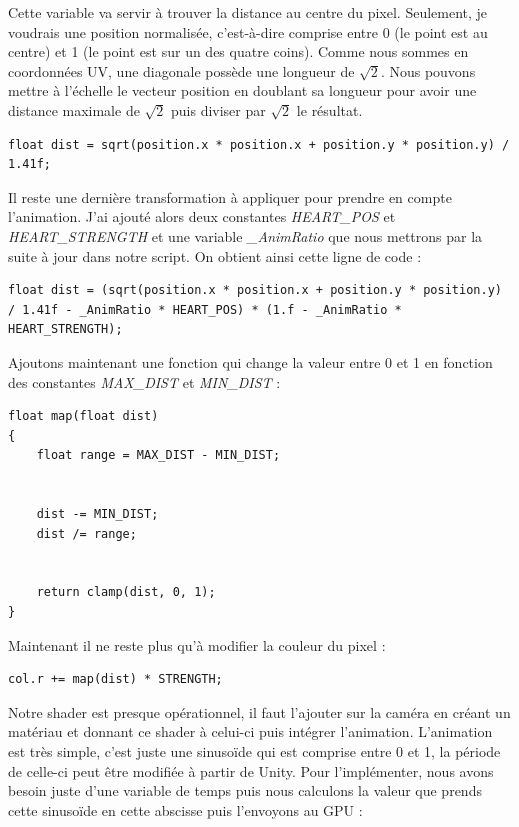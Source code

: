 \documentclass{article}
\begin{document}
Cette variable va servir à trouver la distance au centre du pixel. Seulement, je voudrais une position normalisée, c'est-à-dire comprise entre 0 (le point est au centre) et 1 (le point est sur un des quatre coins). Comme nous sommes en coordonnées UV, une diagonale possède une longueur de $\sqrt{2}$.
Nous pouvons mettre à l'échelle le vecteur position en doublant sa longueur pour avoir une distance maximale de $\sqrt{2}$ puis diviser par $\sqrt{2}$ le résultat.


\begin{lstlisting}
float dist = sqrt(position.x * position.x + position.y * position.y) / 1.41f;
\end{lstlisting}


Il reste une dernière transformation à appliquer pour prendre en compte l'animation.
J'ai ajouté alors deux constantes \emph{HEART\_POS} et \emph{HEART\_STRENGTH} et une variable \emph{\_AnimRatio} que nous mettrons par la suite à jour dans notre script.
On obtient ainsi cette ligne de code :


\begin{lstlisting}
float dist = (sqrt(position.x * position.x + position.y * position.y) / 1.41f - _AnimRatio * HEART_POS) * (1.f - _AnimRatio * HEART_STRENGTH);
\end{lstlisting}


Ajoutons maintenant une fonction qui change la valeur entre 0 et 1 en fonction des constantes \emph{MAX\_DIST} et \emph{MIN\_DIST} :


\begin{lstlisting}
float map(float dist)
{
	float range = MAX_DIST - MIN_DIST;


	dist -= MIN_DIST;
	dist /= range;


	return clamp(dist, 0, 1);
}
\end{lstlisting}


Maintenant il ne reste plus qu'à modifier la couleur du pixel :


\begin{lstlisting}
col.r += map(dist) * STRENGTH;
\end{lstlisting}


Notre shader est presque opérationnel, il faut l'ajouter sur la caméra en créant un matériau et donnant ce shader à celui-ci puis intégrer l'animation. L'animation est très simple, c'est juste une sinusoïde qui est comprise entre 0 et 1, la période de celle-ci peut être modifiée à partir de Unity. Pour l'implémenter, nous avons besoin juste d'une variable de temps puis nous calculons la valeur que prends cette sinusoïde en cette abscisse puis l'envoyons au GPU :
\end{document}
